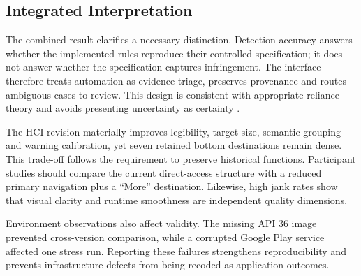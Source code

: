 
\subsection{Integrated Interpretation}

The combined result clarifies a necessary distinction. Detection accuracy answers whether the implemented rules reproduce their controlled specification; it does not answer whether the specification captures infringement. The interface therefore treats automation as evidence triage, preserves provenance and routes ambiguous cases to review. This design is consistent with appropriate-reliance theory and avoids presenting uncertainty as certainty \cite{34}.

The HCI revision materially improves legibility, target size, semantic grouping and warning calibration, yet seven retained bottom destinations remain dense. This trade-off follows the requirement to preserve historical functions. Participant studies should compare the current direct-access structure with a reduced primary navigation plus a ``More'' destination. Likewise, high jank rates show that visual clarity and runtime smoothness are independent quality dimensions.

Environment observations also affect validity. The missing API 36 image prevented cross-version comparison, while a corrupted Google Play service affected one stress run. Reporting these failures strengthens reproducibility and prevents infrastructure defects from being recoded as application outcomes.

